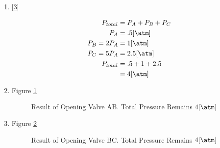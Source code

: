 \documentclass[12pt]{article}
\begin{document}
\begin{enumerate}
\begin{enumerate}
      \item \eqref{3}

        \begin{equation}
          \begin{split}
            P_{total}&=P_A+P_B+P_C\\
            P_A&=.5[\si{\atm}]\\
            P_B=2P_A&=1[\si{\atm}]\\
            P_C=5P_A&=2.5[\si{\atm}]\\
            P_{total}&=.5+1+2.5\\
            &=4[\si{\atm}]
          \end{split}
          \label{3}
        \end{equation}

      \item Figure \ref{fig:1}

        \begin{figure}[H]
          \centering
          
          \caption{Result of Opening Valve AB. Total Pressure Remains $4[\si{\atm}]$}
          \label{fig:1}
        \end{figure}

      \item Figure \ref{fig:2}

        \begin{figure}[H]
          \centering
          
          \caption{Result of Opening Valve BC. Total Pressure Remains $4[\si{\atm}]$}
          \label{fig:2}
        \end{figure}

    \end{enumerate}

    
\end{enumerate}
\end{document}
